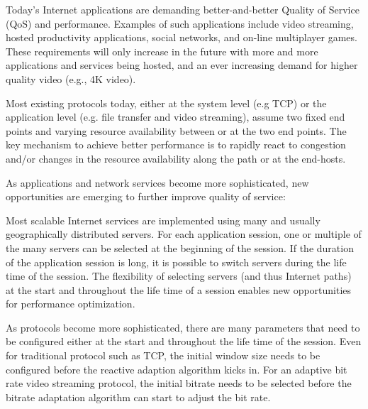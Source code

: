 \label{sec:intro}



Today's Internet applications are demanding better-and-better Quality of Service (QoS) and performance. Examples of such applications include video streaming, hosted productivity applications, social networks, and on-line multiplayer games. These requirements will only increase in the future with more and more applications and services being hosted, and an ever increasing demand for higher quality video (e.g., 4K video).

Most existing protocols today, either at the system level (e.g TCP) or the application level (e.g. file transfer and video streaming), assume two fixed end points and varying resource availability between or at the two end points.  The key mechanism to achieve better performance is to rapidly react to congestion and/or changes in the resource availability along the path or at the end-hosts. 

As applications and network services become more sophisticated,  new opportunities are emerging to further improve quality of service: 

  Most scalable Internet services are implemented using many and usually geographically distributed servers.  For each application session, one or multiple of the many servers can be selected at the beginning of the session.  If the duration of the application session is long, it is possible to switch servers during the life time of the session. The flexibility of selecting servers (and thus Internet paths) at the start and throughout the life time of a session enables new opportunities for performance optimization. 

 As protocols become more sophisticated, there are many parameters that need to be configured either at the start and throughout the life time of the session. Even for traditional protocol such as TCP, the initial window size needs to be configured before the reactive adaption algorithm kicks in. For an adaptive bit rate video streaming protocol, the initial bitrate needs to be selected before the bitrate adaptation algorithm can start to adjust the bit rate. 

